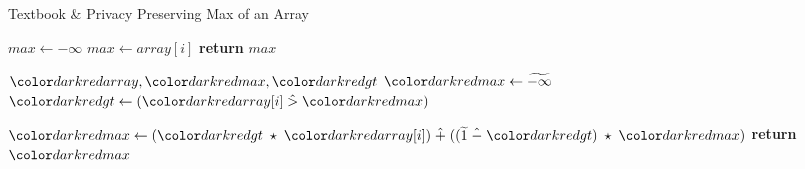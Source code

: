 \begin{algorithm}[H]
\caption{Textbook \& Privacy Preserving Max of an Array}\label{a:max}
\begin{algorithmic}[1]
\renewcommand{\algorithmicrequire}{\textbf{Private Vars:}}

    \State $max  \gets -\infty$
            \State $max \gets array[i]$
        \EndIf
    \EndFor
    \State \textbf{return} {$max$}
\EndProcedure

\begin{spacing}{0.5}
\end{spacing}

\Require $\red{array}, \red{max}, \red{gt}$
    \State $\red{max} \gets \enc{-\infty}$
        \State $\red{gt} \gets (\red{array}[i] \hgt \red{max})$

        \State $\red{max} \gets (\red{gt} \hmul \red{array}[i]) \hplus ((\enc{1} \hminus \red{gt}) \hmul \red{max})$
    \EndFor
    \State \textbf{return} {$\red{max}$}
\EndProcedure

\end{algorithmic}
\end{algorithm}
